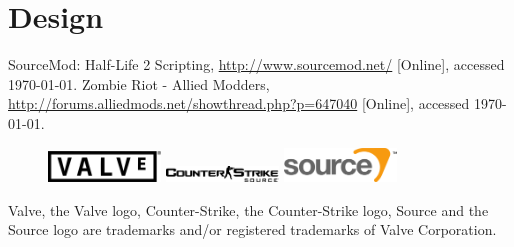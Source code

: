 \documentclass[a4paper, 11pt]{article}
\begin{document}
\section{Design}
\begin{thebibliography}{9}
SourceMod: Half-Life 2 Scripting, \url{http://www.sourcemod.net/} [Online], accessed \today.
Zombie Riot - Allied Modders, \url{http://forums.alliedmods.net/showthread.php?p=647040} [Online], accessed \today.
\end{thebibliography}
\vfill
\begin{figure}[h!]
\includegraphics[width=3cm]{Valve_logo.pdf}
\hfill
\includegraphics[width=3cm]{Counter-Strike_Source_logo.pdf}
\hfill
\includegraphics[width=3cm]{Source_engine_logo.pdf}
\end{figure}
Valve, the Valve logo, Counter-Strike, the Counter-Strike logo, Source and the Source logo are trademarks and/or registered trademarks of Valve Corporation.
\end{document}
